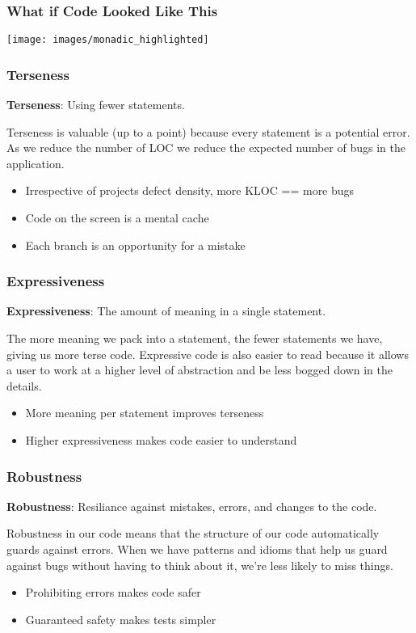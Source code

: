 \documentclass{beamer}
\begin{document}
\begin{frame}
  \frametitle{What if Code Looked Like This}
  \begin{center}
    \texttt{[image: images/monadic\_highlighted]}
  \end{center}
\end{frame}

\begin{frame}
  \frametitle{Terseness}
  {\bf Terseness}: Using fewer statements.
  \par\pause
  Terseness is valuable (up to a point) because every statement is a
  potential error.  As we reduce the number of LOC we reduce the
  expected number of bugs in the application.
  \vfill
  \begin{itemize}
  \item Irrespective of projects defect density, more KLOC == more bugs
  \item Code on the screen is a mental cache
  \item Each branch is an opportunity for a mistake
  \end{itemize}
\end{frame}

\begin{frame}
  \frametitle{Expressiveness}
  {\bf Expressiveness}: The amount of meaning in a single statement.
  \par\pause
  The more meaning we pack into a statement, the fewer statements we
  have, giving us more terse code.  Expressive code is also easier to
  read because it allows a user to work at a higher level of
  abstraction and be less bogged down in the details.
  \vfill
  \begin{itemize}
  \item More meaning per statement improves terseness
  \item Higher expressiveness makes code easier to understand
  \end{itemize}
\end{frame}

\begin{frame}
  \frametitle{Robustness}
  {\bf Robustness}: Resiliance against mistakes, errors, and changes to the code.
  \par\pause
  Robustness in our code means that the structure of our code
  automatically guards against errors.  When we have patterns and
  idioms that help us guard against bugs without having to think about
  it, we're less likely to miss things.
  \vfill
  \begin{itemize}
  \item Prohibiting errors makes code safer
  \item Guaranteed safety makes tests simpler
  \end{itemize}
\end{frame}
\end{document}

